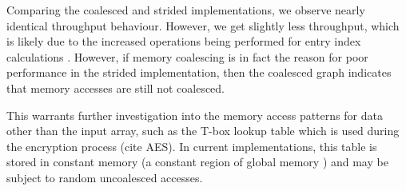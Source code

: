 \documentclass[conference,10pt]{IEEEtran}
\begin{document}
Comparing the coalesced and strided implementations, we observe nearly identical throughput 
behaviour.  However, we get slightly less throughput, which is likely due to the increased 
operations being performed for entry index calculations \cite{opencl_guide}.  However, if memory 
coalescing is in fact the reason for poor performance in the strided implementation, then the 
coalesced graph indicates that memory accesses are still not coalesced.  

This warrants further investigation into the memory access patterns for data other than the input 
array, such as the T-box lookup table which is used during the encryption process (cite AES).  In  
current implementations, this table is stored in constant memory (a constant region of global memory 
\cite{opencl_guide}) and may be subject to random uncoalesced accesses.



%
%


%
\end{document}
